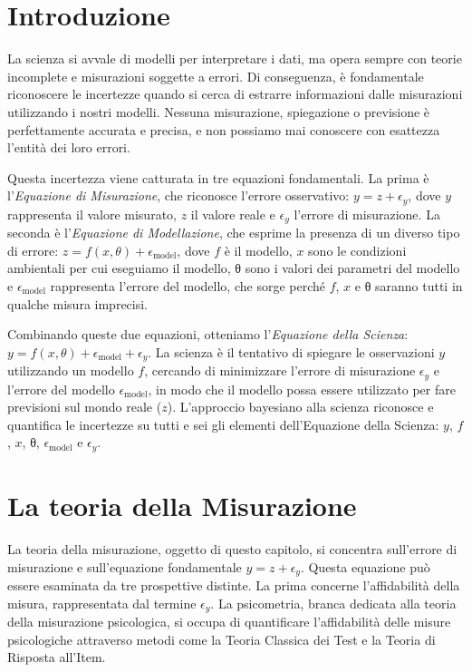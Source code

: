 \documentclass[
  letterpaper,
  krantz2]{{[}./krantz{]}}
\begin{document}
\section{Introduzione}\label{introduzione-5}

La scienza si avvale di modelli per interpretare i dati, ma opera sempre
con teorie incomplete e misurazioni soggette a errori. Di conseguenza, è
fondamentale riconoscere le incertezze quando si cerca di estrarre
informazioni dalle misurazioni utilizzando i nostri modelli. Nessuna
misurazione, spiegazione o previsione è perfettamente accurata e
precisa, e non possiamo mai conoscere con esattezza l'entità dei loro
errori.

Questa incertezza viene catturata in tre equazioni fondamentali. La
prima è l'\emph{Equazione di Misurazione}, che riconosce l'errore
osservativo: \(y = z + ϵ_y\), dove \(y\) rappresenta il valore misurato,
\(z\) il valore reale e \(ϵ_y\) l'errore di misurazione. La seconda è
l'\emph{Equazione di Modellazione}, che esprime la presenza di un
diverso tipo di errore: \(z = f(x,θ) + ϵ_\text{model}\), dove \(f\) è il
modello, \(x\) sono le condizioni ambientali per cui eseguiamo il
modello, θ sono i valori dei parametri del modello e \(ϵ_\text{model}\)
rappresenta l'errore del modello, che sorge perché \(f\), \(x\) e θ
saranno tutti in qualche misura imprecisi.

Combinando queste due equazioni, otteniamo l'\emph{Equazione della
Scienza}: \(y = f(x,θ) + ϵ_\text{model} + ϵ_y\). La scienza è il
tentativo di spiegare le osservazioni \(y\) utilizzando un modello
\(f\), cercando di minimizzare l'errore di misurazione \(ϵ_y\) e
l'errore del modello \(ϵ_\text{model}\), in modo che il modello possa
essere utilizzato per fare previsioni sul mondo reale (\(z\)).
L'approccio bayesiano alla scienza riconosce e quantifica le incertezze
su tutti e sei gli elementi dell'Equazione della Scienza: \(y\), \(f\),
\(x\), θ, \(ϵ_\text{model}\) e \(ϵ_y\).

\section{La teoria della Misurazione}\label{la-teoria-della-misurazione}

La teoria della misurazione, oggetto di questo capitolo, si concentra
sull'errore di misurazione e sull'equazione fondamentale
\(y = z + ϵ_y\). Questa equazione può essere esaminata da tre
prospettive distinte. La prima concerne l'affidabilità della misura,
rappresentata dal termine \(ϵ_y\). La psicometria, branca dedicata alla
teoria della misurazione psicologica, si occupa di quantificare
l'affidabilità delle misure psicologiche attraverso metodi come la
Teoria Classica dei Test e la Teoria di Risposta all'Item.
\end{document}
